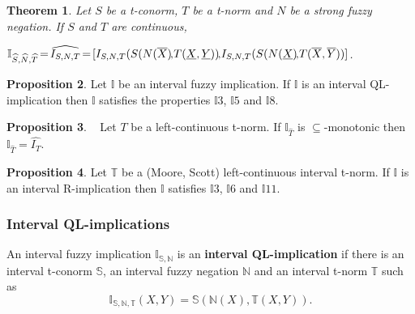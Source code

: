 \documentclass[12pt]{article}
\theoremstyle{plain}
\newtheorem{theorem}{Theorem}[section]
\theoremstyle{remark}
\theoremstyle{definition}
\theoremstyle{proposition}
\newtheorem{proposition}[theorem]{Proposition}
\newcommand{\II}{\mathbb{I} }
\newcommand{\NN}{\mathbb{N} }
\newcommand{\TT}{\mathbb{T} }
\newcommand{\Ss}{\mathbb{S} }
\begin{document}
\begin{theorem}\cite[Theorema 4]{Rei07}\label{teo-QL-imp-BIR}
Let $S$ be a t-conorm, $T$ be a t-norm and $N$ be a strong fuzzy
negation. If $S$ and $T$  are continuous,

$\II_{\widehat{S},\widehat{N},\widehat{T}}\hspace{-0.05cm}=
\hspace{-0.05cm}\widehat{I_{S,N,T}}\hspace{-0.05cm}=\hspace{-0.05cm} [I_{S,N,T}(S(N(\overline{X})\hspace{-0.05cm},\hspace{-0.05cm}T(\underline{X},\underline{Y}))\hspace{-0.05cm},\hspace{-0.05cm} I_{S,N,T}(S(N(\underline{X})\hspace{-0.05cm},\hspace{-0.05cm}T(\overline{X},\overline{Y}))]$.
\end{theorem}

\begin{proposition}\label{pro-int-QLimp-prop}
Let $\II$ be an interval fuzzy implication. If $\II$ is an
interval QL-implication then $\II$ satisfies the properties $\II3$, $\II5$ and $\II8$.
\end{proposition}


\begin{proposition}~\cite[Theorem 24]{BDR09}
Let $T$ be a left-continuous t-norm. If $\II_{\widehat{T}}$ is $\subseteq$-monotonic then
$\II_{\widehat{T}}=\widehat{I_{T}}$.
\end{proposition}

\begin{proposition}\cite[Theorem 14]{BDR09}\label{pn}
Let $\mathbb{T}$ be a (Moore, Scott) left-continuous interval t-norm. If $\II$ is an
interval R-implication then $\II$ satisfies $\II3$, $\II6$ and $\II11$.
\end{proposition}

\subsubsection{Interval QL-implications}\label{subclass-int-ql}

An interval fuzzy implication $\II_{\Ss,\NN}$ is an
\textbf{interval QL-implication} if there is an interval t-conorm
$\Ss$, an interval fuzzy negation $\NN$ and an interval t-norm
$\TT$ such as
\begin{equation}\label{eq-Int-QL-imp}
\II_{\Ss,\NN,\mathbb{T}}(X,Y)=\Ss(\NN(X),\TT(X,Y)).
\end{equation}
\end{document}

